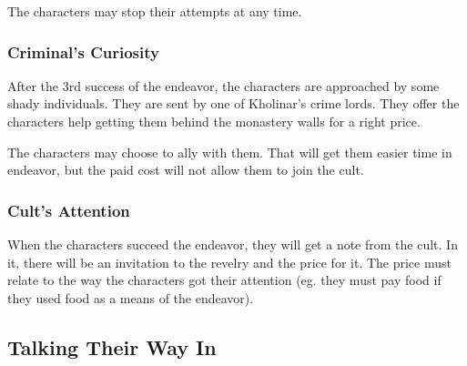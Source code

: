 The characters may stop their attempts at any time.


\subsubsection{Criminal's Curiosity}

After the 3rd success of the endeavor, the characters are approached by some shady individuals. They are sent by one of Kholinar's crime lords. They offer the characters help getting them behind the monastery walls for a right price. 

The characters may choose to ally with them. That will get them easier time in  endeavor, but the paid cost will not allow them to join the cult.

\subsubsection{Cult's Attention}

When the characters succeed the endeavor, they will get a note from the cult. In it, there will be an invitation to the revelry and the price for it. The price must relate to the way the characters got their attention (eg. they must pay food if they used food as a means of the endeavor).






\subsection{Talking Their Way In}


